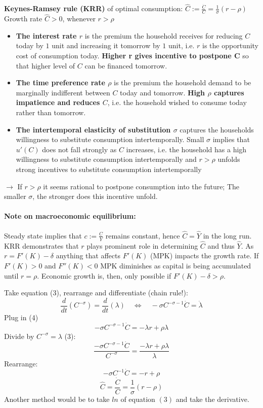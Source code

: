 \textbf{Keynes-Ramsey rule (KRR)} of optimal consumption: $\hat{C}:=\frac{\dot{C}}{C}=\frac{1}{\sigma}(r-\rho)$
\\Growth rate $\hat{C} > 0$, whenever $r>\rho$
\begin{itemize}
        \item \textbf{The interest rate $r$} is the premium the household receives for reducing $C$ today by $1$ unit and increasing it tomorrow by $1$ unit, i.e. $r$ is the opportunity cost of consumption today. \textbf{Higher r gives incentive to postpone C} so that higher level of $C$ can be financed tomorrow. 
        \item \textbf{The time preference rate $\rho$} is the premium the household demand to be marginally indifferent between $C$ today and tomorrow. \textbf{High $\rho$ captures impatience and reduces $C$}, i.e. the household wished to consume today rather than tomorrow.
        \item \textbf{The intertemporal elasticity of substitution $\sigma$ }captures the households willingness to substitute consumption intertemporally. Small $\sigma$ implies that $u'(C)$ does not fall strongly as $C$ increases, i.e. the household has a high willingness to substitute consumption intertemporally and $r>\rho$ unfolds strong incentives to substitute consumption intertemporally
    \end{itemize}
$\longrightarrow$ If $r >\rho$ it seems rational to postpone consumption into the future; The smaller $\sigma$, the stronger does this incentive unfold.

\paragraph{Note on macroeconomic equilibrium:}
Steady state implies that $c:=\frac{C}{Y}$ remains constant, hence $\hat{C}=\hat{Y}$ in the long run. KRR demonstrates that $r$ plays prominent role in determining $\hat{C}$ and thus $\hat{Y}$. As $r=F'(K)-\delta$ anything that affects $F'(K)$ (MPK) impacts the growth rate. If $F'(K)>0$ and $F''(K)<0$ MPK diminishes as capital is being accumulated until $r=\rho$. Economic growth is, then, only possible if $F'(K)-\delta>\rho$.


\begin{tcolorbox}[
    colback=red!5!white, %
    colframe=red!40!white, %
    title=Derivation of the Keynes-Ramsey rule (KRR), %
    fonttitle=\bfseries %
    ]
Take equation (3), rearrange and differentiate (chain rule!): 
$$\frac{d}{dt}(C^{-\sigma}) = \frac{d}{dt}(\lambda) \quad \Leftrightarrow \quad -\sigma C^{-\sigma - 1} \dot{C} = \dot{\lambda}$$
Plug in (4) 
$$ -\sigma C^{-\sigma - 1} \dot{C} = -\lambda r+\rho \lambda $$
Divide by $C^{-\sigma}=\lambda$ (3):
$$ \frac{-\sigma C^{-\sigma - 1} \dot{C}}{C^{-\sigma}} = \frac{-\lambda r+\rho \lambda}{\lambda}$$
Rearrange:
$$-\sigma C^{- 1} \dot{C} = - r+\rho $$
$$\hat{C}=\frac{\dot{C}}{C}=\frac{1}{\sigma}(r-\rho)$$
Another method would be to take $ln$ of equation $(3)$ and take the derivative.
\end{tcolorbox}


